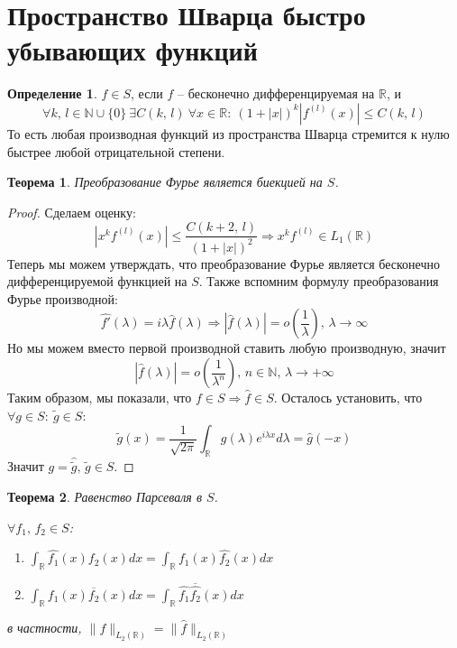 \documentclass[a4paper,12pt]{article}
\renewcommand{\leq}{\ensuremath{\leqslant}}
\theoremstyle{plain}
\newtheorem{theorem}{Теорема}[section]
\theoremstyle{definition}
\newtheorem{definition}{Определение}[section]
\theoremstyle{remark}
\begin{document}
\section{Пространство Шварца быстро убывающих функций}
\begin{definition}
	$f \in S$, если $f$ -- бесконечно дифференцируемая на $\mathbb{R}$, и \[\forall k,\,l \in \mathbb{N} \cup \{0\}\:\exists C(k,\,l) \: \forall x \in \mathbb{R} :\: (1 + |x|)^k|f^{(l)}(x)| \leq C(k,\,l)\]
	То есть любая производная функций из пространства Шварца стремится к нулю быстрее любой отрицательной степени.
\end{definition}

\begin{theorem}
	Преобразование Фурье является биекцией на $S$.
\end{theorem}

\begin{proof}
	Сделаем оценку:
	\[|x^k f^{(l)}(x)| \leq \frac{C(k + 2,\, l)}{(1 + |x|)^2 } \Rightarrow x^kf^{(l)} \in L_1(\mathbb{R})\]
	Теперь мы можем утверждать, что преобразование Фурье является бесконечно дифференцируемой функцией на $S$. Также вспомним формулу преобразования Фурье производной:
	\[\hat{f'}(\lambda) = i\lambda\hat{f}(\lambda) \Rightarrow |\hat{f}(\lambda)| = o\left(\frac{1}{\lambda}\right),\, \lambda \to \infty\]
	Но мы можем вместо первой производной ставить любую производную, значит
	\[|\hat{f}(\lambda)| = o\left(\frac{1}{\lambda^n}\right),\, n \in \mathbb{N},\, \lambda \to +\infty\]
	Таким образом, мы показали, что $f \in S \Rightarrow \hat{f} \in S$. Осталось установить, что $\forall g \in S:\: \tilde{g} \in S$:
	\[\tilde{g}(x) = \frac{1}{\sqrt{2\pi}}\int_\mathbb{R}g(\lambda)e^{i\lambda x}d\lambda = \hat{g}(-x)\]
	Значит $g = \hat{\tilde{g}},\, \tilde{g} \in S$.
\end{proof}

\begin{theorem}
	Равенство Парсеваля в $S$.

	$\forall f_1,\, f_2 \in S$:
	\begin{enumerate}
		\item $\int_\mathbb{R}\hat{f_1}(x)f_2(x)dx = \int_\mathbb{R}f_1(x)\hat{f_2}(x)dx$
		\item $\int_\mathbb{R}f_1(x)\overline{f_2}(x)dx = \int_\mathbb{R}\hat{f_1}\overline{\hat{f_2}}(x)dx$
	\end{enumerate}
	в частности, $\|f\|_{L_2(\mathbb{R})} = \|\hat{f}\|_{L_2(\mathbb{R})}$
\end{theorem}
\end{document}
